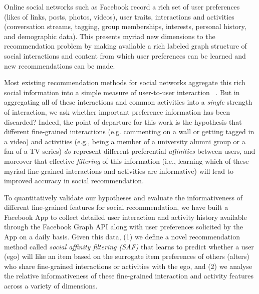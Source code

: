 
\label{sec:introduction}

Online social networks such as Facebook record a rich set of user
preferences (likes of links, posts, photos, videos), user traits,
interactions and activities (conversation streams, tagging, group
memberships, interests, personal history, and demographic data).  This
presents myriad new dimensions to the recommendation problem by making
available a rich labeled graph structure of social interactions and
content from which user preferences can be learned and new
recommendations can be made.

Most existing recommendation methods for social networks aggregate
this rich social information into a simple measure of user-to-user
interaction ~\cite{socinf,rrmf,sr,Noel2012NOF,lla,ste,sorec}.  But in
aggregating all of these interactions and common activities into a
\emph{single} strength of interaction, we
ask whether important preference information has been discarded?
Indeed, the point of departure for this work is the hypothesis that
different fine-grained interactions (e.g. commenting on a wall or
getting tagged in a video) and activities (e.g., being a member of a
university alumni group or a fan of a TV series) \emph{do} represent
different preferential {\em affinities} between users, and moreover
that effective {\em filtering} of this information (i.e., learning
which of these myriad fine-grained interactions and activities are 
informative) will lead to improved accuracy in social recommendation.

To quantitatively validate our hypotheses and evaluate the
informativeness of different fine-grained features for social
recommendation, we have built a Facebook App to collect detailed user
interaction and activity history available through the Facebook Graph
API along with user preferences solicited by the App on a daily basis.
Given this data, (1) we define a novel recommendation method called
{\em social affinity filtering (SAF)} that learns to predict
whether a user (ego) will like an item based on the surrogate item
preferences of others (alters) who share fine-grained interactions or
activities with the ego, and (2) we analyse the relative
informativeness of these fine-grained interaction and activity
features across a variety of dimensions.

